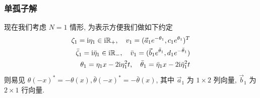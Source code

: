 \subsubsection{单孤子解}
现在我们考虑 $N = 1$ 情形, 为表示方便我们做如下约定
\begin{equation}
    \begin{aligned}
        \zeta_{1} = \mathrm{i} \eta_{1} \in \mathrm{i} \mathbb{R}_{+}, \quad v_{1} = (
        \vec{a}_{1} e^{-\theta_{1}}, c_{1} e^{\theta_{1}})^{T}                                                                                               \\
        \bar{\zeta}_{1} = \mathrm{i} \bar{\eta}_{1} \in \mathrm{i} \mathbb{R}_{-}, \quad \bar{v}_{1} = (\vec{b}_{1} e^{\bar{\theta}_{1}} ,  d_{1} e^{-\bar{\theta}_{1}}) \\
        \theta_{1} = \eta_{1} x - 2 \mathrm{i} \eta_{1}^{2} t, \quad \bar{\theta}_{1} = \bar{\eta}_{1} x - 2 \mathrm{i} \bar{\eta}_{1}^{2} t
    \end{aligned}
\end{equation}
则易见 $\theta(-x)^{*} = -\theta(x), \bar{\theta}(-x)^{*} = -\bar{\theta}(x)$, 其中 $\vec{a}_{1}$ 为 $1\times 2$ 列向量, $\vec{b}_{1}$ 为 $2\times 1$ 行向量.

